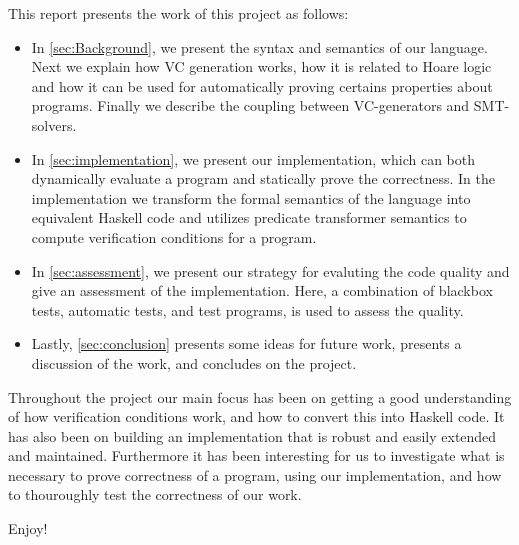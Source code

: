 
This report presents the work of this project as follows:

\begin{itemize}
  \item In \cref{sec:Background}, we present the syntax and semantics of our language.
  Next we explain how VC generation works, how it is related to Hoare logic and how it can be used for automatically proving certains properties about programs. Finally we describe the coupling between VC-generators and SMT-solvers.
\item In \cref{sec:implementation}, we present our implementation, which can both dynamically evaluate a program and statically prove the correctness.
In the implementation we transform the formal semantics of the language into equivalent Haskell code and utilizes predicate transformer semantics to compute verification conditions for a program.
\item In \cref{sec:assessment}, we present our strategy for evaluting the code quality and give an assessment of the implementation.
 Here, a combination of blackbox tests, automatic tests, and test programs, is used to assess the quality.
\item Lastly, \cref{sec:conclusion} presents some ideas for future work, presents a discussion of the work, and concludes on the project.
\end{itemize}

Throughout the project our main focus has been on getting a good understanding of how verification conditions work, and how to convert this into Haskell code. It has also been on building an implementation that is robust and easily extended and maintained.
Furthermore it has been interesting for us to investigate what is necessary to prove correctness of a program, using our implementation, and how to thouroughly test the correctness of our work.

Enjoy!
